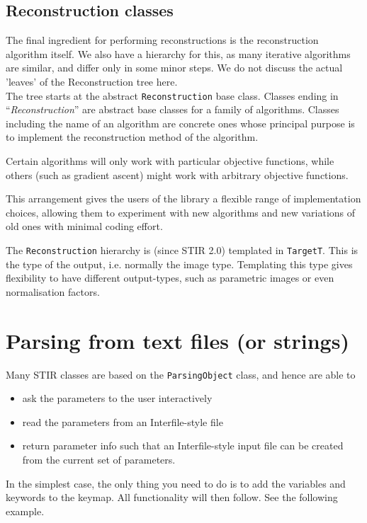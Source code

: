\documentclass{article}
\begin{document}
\subsection{
Reconstruction classes}

The final ingredient for performing reconstructions is the reconstruction 
algorithm itself. We also have a hierarchy for this, as many 
iterative algorithms are similar, and differ only in some minor 
steps. We do not discuss the actual 'leaves' of the Reconstruction 
tree here.
\\
The tree starts at the abstract \texttt{Reconstruction} base class. Classes 
ending in ``\textit{Reconstruction}'' are abstract base classes for 
a family of algorithms. Classes including the name of an algorithm 
are concrete ones whose principal purpose is to implement the 
reconstruction method of the algorithm. 

Certain algorithms will only work with particular objective functions,
while others (such as gradient ascent) might work with arbitrary
objective functions.

This arrangement gives the users 
of the library a flexible range of implementation choices, allowing 
them to experiment with new algorithms and new variations of 
old ones with minimal coding effort.

The \texttt{Reconstruction} hierarchy is (since STIR 2.0) templated in 
\texttt{TargetT}. This is the type of the output, i.e. normally
the image type. Templating this type gives flexibility to have
different output-types, such as parametric images or even 
normalisation factors.

\section{
Parsing from text files (or strings)\label{sect:parsing}}
Many STIR classes are based on the \texttt{ParsingObject} class, and hence 
are able to
\begin{itemize}
\item 
ask the parameters to the user interactively
\item 
read the parameters from an Interfile-style file
\item 
return parameter info such that an Interfile-style input file 
can be created from the current set of parameters.
\end{itemize}

In the simplest case, the only thing you need to do is to add the variables
and keywords to the keymap. All functionality will then follow. See the
following example.
\end{document}
